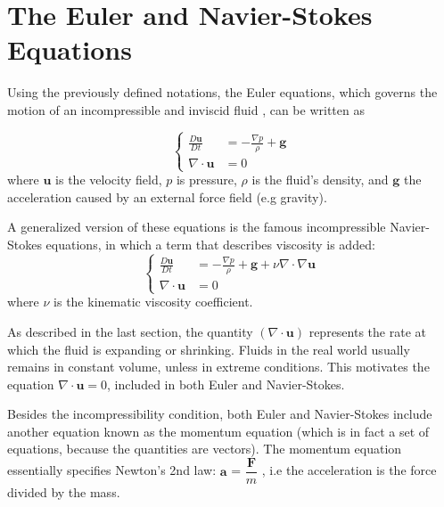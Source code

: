 \section{The Euler and Navier-Stokes Equations}
\label{Euler N-S Eqns}

Using the previously defined notations, the Euler equations, which governs the motion of an incompressible and inviscid fluid
, can be written as

\begin{equation}
    \tag{Euler Equations}
    \left \{
    \begin{aligned}
         \frac{D\textbf{u}}{Dt}   &=   -\frac{\nabla p}{\rho} + \textbf{g} \\
         \nabla \cdot \textbf{u}   &=   0
    \end{aligned} \right.
    \label{eqn:Euler Equations}
\end{equation} 
where $\textbf{u}$ is the velocity field, $p$ is pressure, $\rho$ is the fluid's density, and $\textbf{g}$ the acceleration caused by an external force field (e.g gravity).

A generalized version of these equations is the famous incompressible Navier-Stokes equations, in which a term that describes viscosity is added:
\begin{equation}
    \tag{Navier-Stokes Equations}
    \left \{
    \begin{aligned}
         \frac{D\textbf{u}}{Dt}   &=   -\frac{\nabla p}{\rho} + \textbf{g} + \nu \nabla \cdot \nabla \textbf{u} \\
         \nabla \cdot \textbf{u}  &=   0
    \end{aligned} \right.
    \label{eqn:Navier-Stokes Equations}
\end{equation} 
where $\nu$ is the kinematic viscosity coefficient.


As described in the last section, the quantity $(\nabla \cdot \textbf{u})$ represents the rate at which the fluid is expanding or shrinking. Fluids in the real world usually remains in constant volume, unless in extreme conditions. This motivates the equation $\nabla \cdot \textbf{u} = 0$, included in both Euler and Navier-Stokes.


Besides the incompressibility condition, both Euler and Navier-Stokes include another equation known as the momentum equation (which is in fact a set of equations, because the quantities are vectors). The momentum equation essentially specifies Newton's 2nd law: $\textbf{a}$ = $\dfrac{\textbf{F}}{m}$ , i.e the acceleration is the force divided by the mass.

